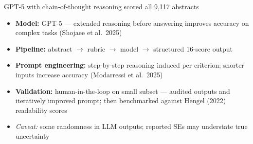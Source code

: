\documentclass[aspectratio=169,11pt]{beamer}
\begin{document}
\begin{frame}{GPT-5 with chain-of-thought reasoning scored all 9,117 abstracts}
    \vfill
    {\normalsize
    \begin{itemize}\setlength\itemsep{0.3cm}
        \item \textbf{Model:} GPT-5 — extended reasoning before answering improves accuracy on complex tasks (Shojaee et al.\ 2025)
        \item \textbf{Pipeline:} abstract $\rightarrow$ rubric $\rightarrow$ model $\rightarrow$ structured 16-score output
        \item \textbf{Prompt engineering:} step-by-step reasoning induced per criterion; shorter inputs increase accuracy (Modarressi et al.\ 2025)
        \item \textbf{Validation:} human-in-the-loop on small subset --- audited outputs and iteratively improved prompt; then benchmarked against Hengel (2022) readability scores
        \item {\color{WarmGray}\textit{Caveat:} some randomness in LLM outputs; reported SEs may understate true uncertainty}
    \end{itemize}
    }
    \vfill
\end{frame}
\end{document}
